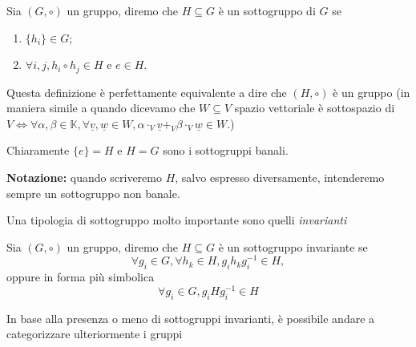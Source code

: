 \begin{definition}[sottogruppi]
	Sia $(G, \circ)$ un gruppo, diremo che $H \subseteq G$ è un sottogruppo di $G$ se
	\begin{enumerate}[label=\protect\circled{\arabic*}]
		\item $\{ h_i \} \in G$;
		\item $\forall i, j, h_i \circ h_j \in H$ e $e \in H$.
	\end{enumerate}
\end{definition}
\begin{remark}
	Questa definizione è perfettamente equivalente a dire che $(H, \circ)$ è un gruppo (in maniera simile a quando dicevamo che $W \subseteq V$ spazio vettoriale è sottospazio di $V \iff \forall \alpha, \beta \in \mathbb{K}, \forall \underline{v}, \underline{w} \in W, \alpha \cdot_ V \underline{v} +_V \beta \cdot_V \underline{w} \in W$.)
\end{remark}
\begin{remark}
	Chiaramente $\{ e \} = H$ e $H = G$ sono i sottogruppi banali.
\end{remark}

\textbf{Notazione:} quando scriveremo $H$, salvo espresso diversamente, intenderemo sempre un sottogruppo non banale.

Una tipologia di sottogruppo molto importante sono quelli \emph{invarianti}

\begin{definition}
	Sia $(G, \circ)$ un gruppo, diremo che $H \subseteq G$ è un sottogruppo invariante se
	\begin{equation}
		\forall g_i \in G, \forall h_k \in H, g_i h_k g_i^{-1} \in H,
	\end{equation}
	oppure in forma più simbolica
	\begin{equation}
		\forall g_i \in G, g_i H g_i^{-1} \in H
	\end{equation}
\end{definition}

In base alla presenza o meno di sottogruppi invarianti, è possibile andare a categorizzare ulteriormente i gruppi

